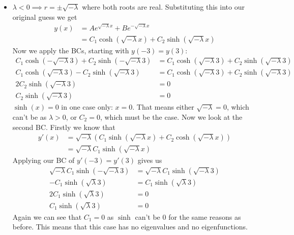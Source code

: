 \documentclass[12pt]{article}
\numberwithin{equation}{section}
\numberwithin{figure}{section}
\begin{document}
\begin{enumerate}
\begin{itemize}
            \item $\lambda<0 \implies r=\pm\sqrt{-\lambda}$ where both roots are real. Substituting this into 
            our original guess we get
            \begin{align*}
                y(x)&=Ae^{\sqrt{-\lambda}x}+Be^{-\sqrt{-\lambda}x}\\
                &=C_1\cosh(\sqrt{-\lambda}x)+C_2\sinh(\sqrt{-\lambda}x)
            \end{align*}
            Now we apply the BCs, starting with $y(-3)=y(3)$:
            \begin{align*}
                C_1\cosh(-\sqrt{-\lambda}3)+C_2\sinh(-\sqrt{-\lambda}3)&=C_1\cosh(\sqrt{-\lambda}3)+C_2\sinh(\sqrt{-\lambda}3)\\
                C_1\cosh(\sqrt{-\lambda}3)-C_2\sinh(\sqrt{-\lambda}3)&=C_1\cosh(\sqrt{-\lambda}3)+C_2\sinh(\sqrt{-\lambda}3)\\
                2C_2\sinh(\sqrt{-\lambda}3)&=0\\
                C_2\sinh(\sqrt{-\lambda}3)&=0
            \end{align*}
            $\sinh(x)=0$ in one case only: $x=0$. That means either $\sqrt{-\lambda}=0$, which can't be as $\lambda>0$, or 
            $C_2=0$, which must be the case. \newline
            Now we look at the second BC. Firstly we know that 
            \begin{align*}
                y'(x)&=\sqrt{-\lambda}(C_1\sinh(\sqrt{-\lambda}x)+C_2\cosh(\sqrt{-\lambda}x))\\
                &=\sqrt{-\lambda}C_1\sinh(\sqrt{-\lambda}x)
            \end{align*}
            Applying our BC of $y'(-3)=y'(3)$ gives us
            \begin{align*}
                \sqrt{-\lambda}C_1\sinh(-\sqrt{-\lambda}3)&=\sqrt{-\lambda}C_1\sinh(\sqrt{-\lambda}3)\\
                -C_1\sinh(\sqrt{\lambda}3)&=C_1\sinh(\sqrt{\lambda}3)\\
                2C_1\sinh(\sqrt{\lambda}3)&=0\\
                C_1\sinh(\sqrt{\lambda}3)&=0
            \end{align*}
            Again we can see that $C_1=0$ as $\sinh$ can't be 0 for the same reasons as before. This means 
            that this case has no eigenvalues and no eigenfunctions.
        \end{itemize}


\end{enumerate}
\end{document}
